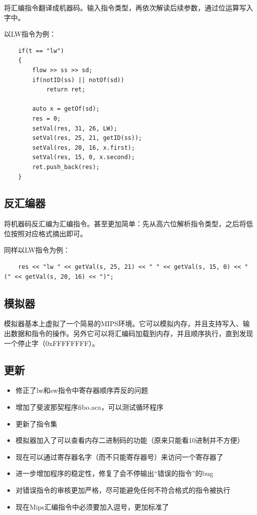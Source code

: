\documentclass{ctexart}
\begin{document}
        \par 将汇编指令翻译成机器码。输入指令类型，再依次解读后续参数，通过位运算写入字中。
        \par 以LW指令为例：
        
\begin{lstlisting}
    if(t == "lw")
    {
        flow >> ss >> sd;
        if(notID(ss) || notOf(sd))
            return ret;

        auto x = getOf(sd);
        res = 0; 
        setVal(res, 31, 26, LW);
        setVal(res, 25, 21, getID(ss));
        setVal(res, 20, 16, x.first);
        setVal(res, 15, 0, x.second);
        ret.push_back(res);
    }
\end{lstlisting}

    \subsection {反汇编器}
    
        \par 将机器码反汇编为汇编指令。甚至更加简单：先从高六位解析指令类型，之后将低位按照对应格式摘出即可。
        \par 同样以LW指令为例：
        
\begin{lstlisting}
    res << "lw " << getVal(s, 25, 21) << " " << getVal(s, 15, 0) << "(" << getVal(s, 20, 16) << ")";
\end{lstlisting}
        
    \subsection {模拟器}
        \par 模拟器基本上虚拟了一个简易的MIPS环境。它可以模拟内存，并且支持写入、输出数据和指令的操作。另外它可以将汇编码加载到内存，并且顺序执行，直到发现一个停止字（0xFFFFFFFF）。
        
    \subsection {更新}
    
        \begin{itemize}
\item 修正了lw和sw指令中寄存器顺序弄反的问题
\item 增加了斐波那契程序fibo.aca，可以测试循环程序
\item 更新了指令集   
\item 模拟器加入了可以查看内存二进制码的功能（原来只能看10进制并不方便）  
\item 现在可以通过寄存器名字（而不只能寄存器号）来访问一个寄存器了  
\item 进一步增加程序的稳定性，修复了会不停输出“错误的指令”的bug  
\item 对错误指令的审核更加严格，尽可能避免任何不符合格式的指令被执行  
\item 现在Mips汇编指令中必须要加入逗号，更加标准了  
        \end{itemize}
\end{document}
